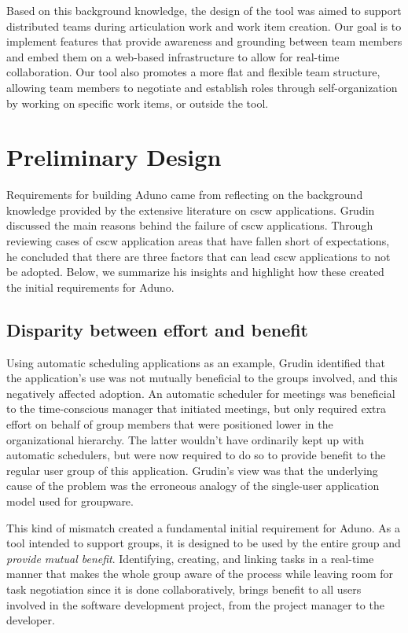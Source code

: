 \documentclass[conference]{IEEEtran}
\begin{document}
Based on this background knowledge, the design of the tool was aimed to support distributed teams during articulation work and work item creation. Our goal is to implement features that provide awareness and grounding between team members and embed them on a web-based infrastructure to allow for real-time collaboration. Our tool also promotes a more flat and flexible team structure, allowing team members to negotiate and establish roles through self-organization by working on specific work items, or outside the tool.

\section{Preliminary Design}
\label{sec:pdesign}

Requirements for building Aduno came from reflecting on the background knowledge provided by the extensive literature on {\sc cscw} applications. Grudin \cite{Grudin88} discussed the main reasons behind the failure of {\sc cscw} applications. Through reviewing cases of {\sc cscw} application areas that have fallen short of expectations, he concluded that there are three factors that can lead {\sc cscw} applications to not be adopted. Below, we summarize his insights and highlight how these created the initial requirements for Aduno.

\subsection{Disparity between effort and benefit}
Using automatic scheduling applications as an example, Grudin identified that the application's use was not mutually beneficial to the groups involved, and this negatively affected adoption. An automatic scheduler for meetings was beneficial to the time-conscious manager that initiated meetings, but only required extra effort on behalf of group members that were positioned lower in the organizational hierarchy. The latter wouldn't have ordinarily kept up with automatic schedulers, but were now required to do so to provide benefit to the regular user group of this application. Grudin's view was that the underlying cause of the problem was the erroneous analogy of the single-user application model used for groupware.

This kind of mismatch created a fundamental initial requirement for Aduno. As a tool intended to support groups, it is designed to be used by the entire group and \textit{provide mutual benefit}. Identifying, creating, and linking tasks in a real-time manner that makes the whole group aware of the process while leaving room for task negotiation since it is done collaboratively, brings benefit to all users involved in the software development project, from the project manager to the developer.
\end{document}
